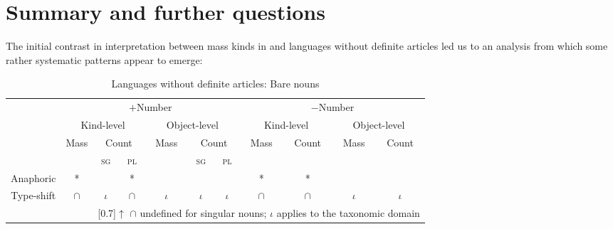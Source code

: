 \documentclass[output=paper,
modfonts
]{langscibook}
\begin{document}
	\section{Summary and further questions} \label{sec:despic:5} 
	
	The initial contrast in interpretation between mass kinds in  and languages without
	definite articles led us to an analysis from which some rather systematic patterns appear to emerge: 
	
	\begin{table} 
		\caption{Languages without definite articles: Bare nouns}
		\begin{tabular}{c|c|c|c|c|c|c|c|c|c|c|}
			\cline{2-11}
			& \multicolumn{6}{|c|}{$+${\footnotesize Number}} & \multicolumn{4}{|c|}{$-${\footnotesize Number}} \\
			\cline{2-11}
			& 
			\multicolumn{3}{|c|}{{{\footnotesize Kind-level}}} & \multicolumn{3}{|c|}{{{\footnotesize Object-level}}} & \multicolumn{2}{|c|}{{{\footnotesize Kind-level}}} & \multicolumn{2}{|c|}{{{\footnotesize Object-level}}} \\
			\cline{2-11}
			& \footnotesize Mass & \multicolumn{2}{|c|}{\footnotesize Count} & \footnotesize Mass & \multicolumn{2}{|c|}{\footnotesize Count} & \footnotesize Mass & \footnotesize Count & \footnotesize Mass & \footnotesize Count \\
			\cline{2-11}
			& \cellcolor{lightgray} & \cellcolor{gray}\textsc{sg} & \textsc{pl} & \cellcolor{lightgray} & \textsc{sg} & \textsc{pl} & \cellcolor{lightgray} & \cellcolor{lightgray} & \cellcolor{lightgray} & \cellcolor{lightgray} \\
			
			\hline
			\multicolumn{1}{|c|}{\footnotesize {Anaphoric}} & * & \cellcolor{gray}\checkmark & * & \checkmark & \checkmark & \checkmark & * & * & \checkmark & \checkmark \\
			
			\hline
			\multicolumn{1}{|c|}{\footnotesize {Type-shift}} & $\cap$ & \cellcolor{gray}$\iota$ & $\cap$ & $\iota$  & $\iota$ & $\iota$ & $\cap$ & $\cap$ & $\iota$ & $\iota$ \\ \hline
			\multicolumn{2}{c}{} & \multicolumn{9}{l}{\scalebox{0.8}[0.7]{$\uparrow$} \footnotesize $\cap$ undefined for singular nouns; $\iota$ applies to the taxonomic domain
			}
		\end{tabular}
		\label{tab:despic:1}
	\end{table}
	
\end{document}
